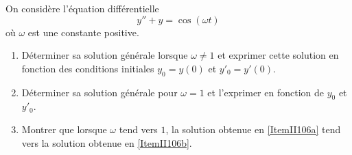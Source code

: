 \begin{exercice}\label{exo_II-1-06}

On considère l'équation différentielle 
\begin{equation}
	y''+y=\cos(\omega t)
\end{equation}
où $\omega$ est une constante positive.
\begin{enumerate}
\item\label{ItemII106a} Déterminer sa solution générale lorsque $\omega\neq 1$ et exprimer cette solution en fonction des conditions initiales $y_0=y(0)$ et $y'_0=y'(0)$.
\item\label{ItemII106b} Déterminer sa solution générale pour $\omega=1$ et l'exprimer en fonction de $y_0$ et $y'_0$.
\item Montrer que lorsque $\omega$ tend vers $1$, la solution obtenue en \ref{ItemII106a} tend vers la solution obtenue en \ref{ItemII106b}.
\end{enumerate}

\end{exercice}


